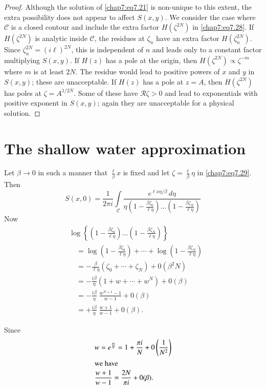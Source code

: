 {{\begin{proof}
Although the solution of \eqref{chap7:eq7.21} is non-unique to this extent, the extra possibility does not appear to affect $S(x,y)$. We consider the case where $\mathscr{C}$ is a closed contour and include the extra factor $H(\zeta^{2N})$ in \eqref{chap7:eq7.28}. If $H(\zeta^{2N})$ is analytic inside $\mathscr{C}$, the residues at $\zeta_n$ have an extra factor $H(\zeta_n^{2N})$. Since $\zeta_n^{2N}=(i\ell)^{2N}$, this is independent of $n$ and leads only to a constant factor multiplying $S(x,y)$. If $H(z)$ has a pole at the origin, then $H(\zeta^{2N})\propto\zeta^{-m}$ where $m$ is at least $2N$. The residue would lead to positive powers of $x$ and $y$ in $S(x,y)$; these are unacceptable. If $H(z)$ has a pole at $z=A$, then $H(\zeta^{2N})$ has poles at $\zeta=A^{1/2N}$. Some of these have $\mathscr{R}\zeta >0$ and lead to exponentials with positive exponent in $S(x,y)$; again they are unacceptable for a physical solution. 
 \end{proof}

\section{The shallow water approximation}\label{chap7:sec7.2}

Let $\beta\to 0$ in such a manner that $\frac{\ell}{\beta}x$ is fixed and let $\zeta=\frac{\ell}{\beta}\eta$ in \eqref{chap7:eq7.29}. Then 
$$
S(x,0)=\frac{1}{2\pi i}\int\limits_{\mathscr{C}}\frac{e^{\ell x\eta/\beta}\,d\eta} {\eta\left(1-\frac{\beta\zeta_0}{\ell\eta}\right)\ldots\left(1-\frac{\beta\zeta_N}{\ell\eta}\right)}
$$
Now 
\begin{align*}
&\log\left\{\left(1-\frac{\beta\zeta_0}{\ell\eta}\right)\ldots\left(1-\frac {\beta\zeta_N}{\ell\eta}\right)\right\}\\
&\quad=\log\left(1-\frac{\beta\zeta_0}{\ell\eta}\right)+\cdots+\log\left(1- \frac{\beta\zeta_N}{\ell\eta}\right)\\
&\quad =-\frac{\beta}{\ell\eta}\left(\zeta_0+\cdots+\zeta_N\right)+0 (\beta^2N)\\
&\quad =-\frac{i\beta}{\eta}\left(1+w+\cdots+w^N\right)+0(\beta)\\
&\quad =-\frac{i\beta}{\eta}\;\frac{w^{N+1}-1}{w-1}+0(\beta)\\
&\quad =+\frac{i\beta}{\eta}\;\frac{w+1}{w-1}+0(\beta).
\end{align*}\pageoriginale

Since
\begin{align*}
& w=e^{\frac{\pi i}{N}} = 1  + \frac{\pi i}{N}+0\left(\frac{1}{N^2}\right)\\
\intertext{we have}
& \frac{w+1}{w-1}=\frac{2N}{\pi i}+0(\beta).
\end{align*}

}}
